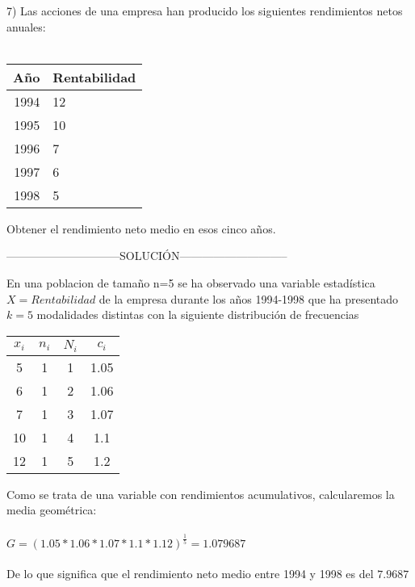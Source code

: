 7) Las acciones de una empresa han producido los siguientes rendimientos netos anuales:\\\\
\begin{center}
	\begin{tabular}{r l}
	Año & Rentabilidad \\ \hline
	1994 & 12 \\
	1995 &10 \\
	1996 & 7 \\
	1997 & 6 \\
	1998 & 5 \\
\end{tabular}
\end{center}
Obtener el rendimiento neto medio en esos cinco años.

\begin{center}
	------------------------------SOLUCIÓN-----------------------------
\end{center}

En una poblacion de tamaño n=5 se ha observado una variable estadística $ X = Rentabilidad $  de la empresa durante los años 1994-1998 que ha presentado $k = 5$ modalidades distintas con la siguiente distribución de frecuencias
\\

	\begin{center}
		\begin{tabular}{| c | c | c | c | }
			\hline
			
			$x_{i}$ & $n_{i}$ & $N_{i}$ & $c_{i}$ \\ \hline
			5 & 1  & 1 & 1.05 \\
			6 & 1 & 2 & 1.06 \\
			7 & 1 & 3 & 1.07 \\
			10 & 1 & 4 & 1.1 \\
			12 & 1 & 5 & 1.2 \\ \hline
		\end{tabular}
		
	\end{center}
Como se trata de una variable con rendimientos acumulativos, calcularemos la media geométrica:
\\
\\
$ G = (1.05 * 1.06 * 1.07 * 1.1 * 1.12)^{\frac{1}{5}} = 1.079687$
\\
\\
De lo que significa que el rendimiento neto medio entre 1994 y 1998 es del $7.9687$\textperthousand
